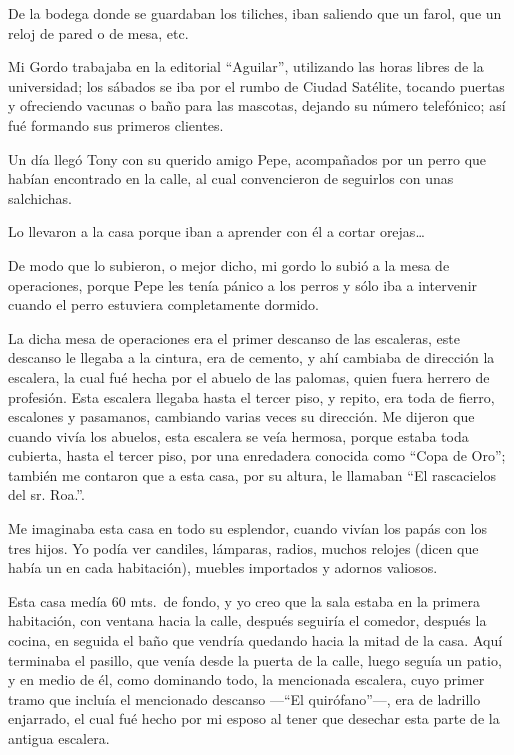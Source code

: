 \documentclass[letterpaper, 12pt]{book}
\begin{document}
De la bodega donde se guardaban los tiliches, iban saliendo que un farol, que un reloj de pared o de mesa, etc.

Mi Gordo trabajaba en la editorial ``Aguilar'', utilizando las horas libres de la universidad; los sábados se iba por el rumbo de Ciudad Satélite, tocando puertas y ofreciendo vacunas o baño para las mascotas, dejando su número telefónico; así fué formando sus primeros clientes.

Un día llegó Tony con su querido amigo Pepe, acompañados por un perro que habían encontrado en la calle, al cual convencieron de seguirlos con unas salchichas.

Lo llevaron a la casa porque iban a aprender con él a cortar orejas\ldots

De modo que lo subieron, o mejor dicho, mi gordo lo subió a la mesa de operaciones, porque Pepe les tenía pánico a los perros y sólo iba a intervenir cuando el perro estuviera completamente dormido.

La dicha mesa de operaciones era el primer descanso de las escaleras, este descanso le llegaba a la cintura, era de cemento, y ahí cambiaba de dirección la escalera, la cual fué hecha por el abuelo de las palomas, quien fuera herrero de profesión. Esta escalera llegaba hasta el tercer piso, y repito, era toda de fierro, escalones y pasamanos, cambiando varias veces su dirección. Me dijeron que cuando vivía los abuelos, esta escalera se veía hermosa, porque estaba toda cubierta, hasta el tercer piso, por una enredadera conocida como ``Copa de Oro''; también me contaron que a esta casa, por su altura, le llamaban ``El rascacielos del sr.  Roa.''. 

Me imaginaba  esta casa en todo su esplendor, cuando vivían los papás con los tres hijos. Yo podía ver candiles, lámparas, radios, muchos relojes (dicen que había un en cada habitación), muebles importados y adornos valiosos.

Esta casa medía 60 mts.\ de fondo, y yo creo que la sala estaba en la primera habitación, con ventana hacia la calle, después seguiría el comedor, después la cocina, en seguida el baño que vendría quedando hacia la mitad de la casa. Aquí terminaba el pasillo, que venía desde la puerta de la calle, luego seguía un patio, y en medio de él, como dominando todo, la mencionada escalera, cuyo primer tramo que incluía el mencionado descanso ---``El quirófano''---, era de ladrillo enjarrado, el cual fué hecho por mi esposo al tener que desechar esta parte de la antigua escalera.
\end{document}
